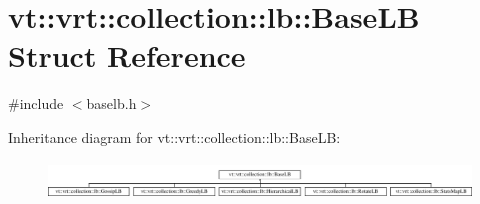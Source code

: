 \hypertarget{structvt_1_1vrt_1_1collection_1_1lb_1_1_base_l_b}{}\section{vt\+:\+:vrt\+:\+:collection\+:\+:lb\+:\+:Base\+LB Struct Reference}
\label{structvt_1_1vrt_1_1collection_1_1lb_1_1_base_l_b}


{\ttfamily \#include $<$baselb.\+h$>$}

Inheritance diagram for vt\+:\+:vrt\+:\+:collection\+:\+:lb\+:\+:Base\+LB\+:\begin{figure}[H]
\begin{center}
\leavevmode
\includegraphics[height=1.027523cm]{structvt_1_1vrt_1_1collection_1_1lb_1_1_base_l_b}
\end{center}
\end{figure}
